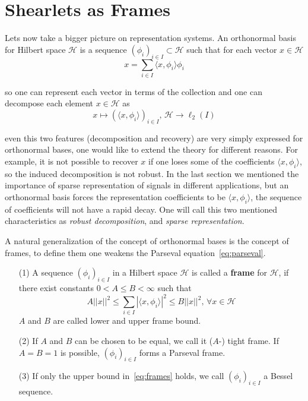 \section{Shearlets as Frames}
\label{sec:ShearletsFrames}

Lets now take a bigger picture on representation systems. An orthonormal basis for Hilbert space $\mathcal{H}$ is a sequence $(\phi_i)_{i\in I}\subset\mathcal{H}$ such that for each vector $x\in\mathcal{H}$
\begin{equation}
\label{eq:parseval}
x=\sum_{i\in I}\langle x,\phi_i\rangle \phi_i
\end{equation}

so one can represent each vector in terms of the collection and one can decompose each element $x\in\mathcal{H}$ as
$$
x\mapsto (\langle x,\phi_i\rangle)_{i\in I}\text{,  }\mathcal{H}\longrightarrow \ell_2(I)
$$

even this two features (decomposition and recovery) are very simply expressed for orthonormal bases, one would like to extend the theory for different reasons. For example, it is not possible to recover $x$ if one loses some of the coefficients $\langle x, \phi_i\rangle$, so the induced decomposition is not robust. In the last section we mentioned the importance of sparse representation of signals in different applications, but an orthonormal basis forces the representation coefficients to be $\langle x,\phi_i\rangle$, the sequence of coefficients will not have a rapid decay. One will call this two mentioned characteristics as \textit{robust decomposition}, and \textit{sparse representation}. 

\bigskip

A natural generalization of the concept of orthonormal bases is the concept of frames, to define them one weakens the Parseval equation~\ref{eq:parseval}.

\bigskip

\begin{defn}
\label{def:frames}
\begin{enumerate}
\item[(1)] A sequence $(\phi_i)_{i\in I}$ in a Hilbert space $\mathcal{H}$ is called a \textbf{frame} for $\mathcal{H}$, if there exist constants $0<A\leq B<\infty$ such that
\begin{equation}
\label{eq:frames}
A||x||^2\leq \sum_{i\in I}|\langle x,\phi_i\rangle|^2\leq B||x||^2 \text{,  }\forall x\in \mathcal{H}
\end{equation}
$A$ and $B$ are called lower and upper frame bound.
\item[(2)] If $A$ and $B$ can be chosen to be equal, we call it ($A$-) tight frame. If $A=B=1$ is possible, $(\phi_i)_{i\in I}$ forms a Parseval frame.
\item[(3)] If only the upper bound in~\ref{eq:frames} holds, we call $(\phi_i)_{i\in I}$ a Bessel sequence.
\end{enumerate}
\end{defn}

